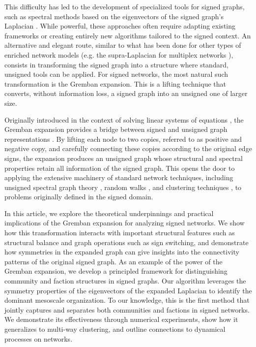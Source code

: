 \documentclass[reprint,onecolumn]{article}
\newcommand{\1}{\mathbb{1}}
\newcommand{\0}{\mathbf{0}}
\begin{document}
This difficulty has led to the development of specialized tools for signed graphs, such as  spectral methods based on the eigenvectors of the signed graph's Laplacian \cite{cucuringu2019sponge,kunegis2010spectral}. While powerful, these approaches often require adapting existing frameworks or creating entirely new algorithms tailored to the signed context. An alternative and elegant route, similar to what has been done for other types of enriched network models \cite{lambiotte2019networks} (e.g. the supra-Laplacian for multiplex networks \cite{gomez2013diffusion}), consists in transforming the signed graph into a structure where standard, unsigned tools can be applied. For signed networks, the most natural such transformation is the Gremban expansion. This is a lifting technique that converts, without information loss, a signed graph into an unsigned one of larger size.

Originally introduced in the context of solving linear systems of equations \cite{gremban1996combinatorial}, the Gremban expansion provides a  bridge between signed and unsigned graph representations \cite{fox2018investigation,lambiotte2024spreading}. By lifting each node to two copies, referred to as positive and negative copy, and carefully connecting these copies according to the original edge signs, the expansion produces an unsigned graph whose structural and spectral properties retain all information of the signed graph. This opens the door to applying the extensive machinery of standard network techniques, including unsigned spectral graph theory \cite{chung1997spectral}, random walks \cite{Masuda2017RW}, and clustering techniques \cite{fortunato2010community}, to problems originally defined in the signed domain.

In this article, we explore the theoretical underpinnings 
and practical implications of the Gremban expansion for analyzing signed networks. We show how this transformation interacts with important structural features such as structural balance and graph operations such as sign switching, and demonstrate how symmetries in the expanded graph can give insights into the  connectivity patterns of the original signed graph. As an example of the power of the Gremban expansion, we develop a principled framework for distinguishing community and faction structures in signed graphs. Our algorithm leverages the symmetry properties of the eigenvectors of the expanded Laplacian to identify the dominant mesoscale organization. To our knowledge, this is the first method that jointly captures and separates both communities and factions in signed networks. We demonstrate its effectiveness through numerical experiments, show how it generalizes to multi-way clustering, and outline connections to dynamical processes on networks.  
\end{document}
